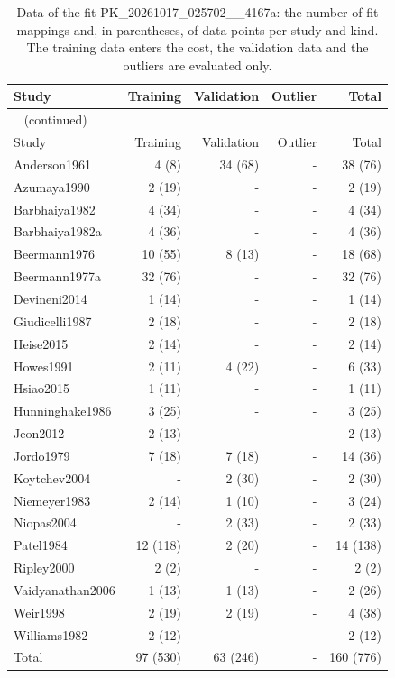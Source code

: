 \documentclass{article}
\begin{document}
\begin{longtable}{lrrrr}
\caption{Data of the fit PK\_20261017\_025702\_\_4167a: the number of fit mappings and, in parentheses, of data points per study and kind. The training data enters the cost, the validation data and the outliers are evaluated only.}\label{tab:data:PK_20261017_025702__4167a} \\
\toprule
Study & Training & Validation & Outlier & Total \\
\midrule
\endfirsthead
\multicolumn{5}{l}{\small\tablename~\thetable{} (continued)} \\
\toprule
Study & Training & Validation & Outlier & Total \\
\midrule
\endhead
\bottomrule
\endlastfoot
Anderson1961 & 4 (8) & 34 (68) & - & 38 (76) \\
Azumaya1990 & 2 (19) & - & - & 2 (19) \\
Barbhaiya1982 & 4 (34) & - & - & 4 (34) \\
Barbhaiya1982a & 4 (36) & - & - & 4 (36) \\
Beermann1976 & 10 (55) & 8 (13) & - & 18 (68) \\
Beermann1977a & 32 (76) & - & - & 32 (76) \\
Devineni2014 & 1 (14) & - & - & 1 (14) \\
Giudicelli1987 & 2 (18) & - & - & 2 (18) \\
Heise2015 & 2 (14) & - & - & 2 (14) \\
Howes1991 & 2 (11) & 4 (22) & - & 6 (33) \\
Hsiao2015 & 1 (11) & - & - & 1 (11) \\
Hunninghake1986 & 3 (25) & - & - & 3 (25) \\
Jeon2012 & 2 (13) & - & - & 2 (13) \\
Jordo1979 & 7 (18) & 7 (18) & - & 14 (36) \\
Koytchev2004 & - & 2 (30) & - & 2 (30) \\
Niemeyer1983 & 2 (14) & 1 (10) & - & 3 (24) \\
Niopas2004 & - & 2 (33) & - & 2 (33) \\
Patel1984 & 12 (118) & 2 (20) & - & 14 (138) \\
Ripley2000 & 2 (2) & - & - & 2 (2) \\
Vaidyanathan2006 & 1 (13) & 1 (13) & - & 2 (26) \\
Weir1998 & 2 (19) & 2 (19) & - & 4 (38) \\
Williams1982 & 2 (12) & - & - & 2 (12) \\
Total & 97 (530) & 63 (246) & - & 160 (776) \\
\end{longtable}
\end{document}
